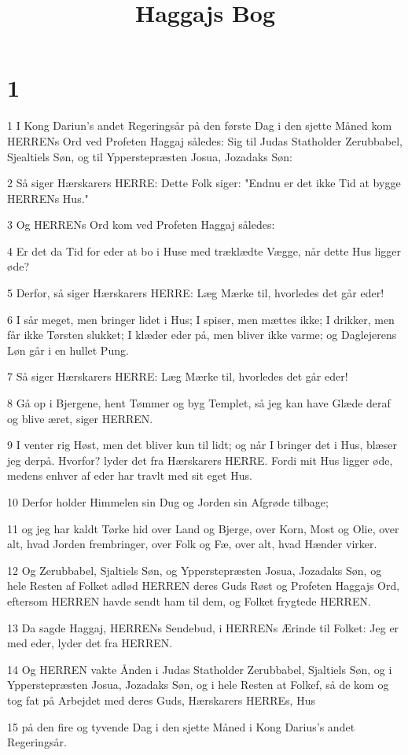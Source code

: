

\title{Haggajs Bog}


\chapter{1}

\par 1 I Kong Dariun's andet Regeringsår på den første Dag i den sjette Måned kom HERRENs Ord ved Profeten Haggaj således: Sig til Judas Statholder Zerubbabel, Sjealtiels Søn, og til Ypperstepræsten Josua, Jozadaks Søn:
\par 2 Så siger Hærskarers HERRE: Dette Folk siger: "Endnu er det ikke Tid at bygge HERRENs Hus."
\par 3 Og HERRENs Ord kom ved Profeten Haggaj således:
\par 4 Er det da Tid for eder at bo i Huse med træklædte Vægge, når dette Hus ligger øde?
\par 5 Derfor, så siger Hærskarers HERRE: Læg Mærke til, hvorledes det går eder!
\par 6 I sår meget, men bringer lidet i Hus; I spiser, men mættes ikke; I drikker, men får ikke Tørsten slukket; I klæder eder på, men bliver ikke varme; og Daglejerens Løn går i en hullet Pung.
\par 7 Så siger Hærskarers HERRE: Læg Mærke til, hvorledes det går eder!
\par 8 Gå op i Bjergene, hent Tømmer og byg Templet, så jeg kan have Glæde deraf og blive æret, siger HERREN.
\par 9 I venter rig Høst, men det bliver kun til lidt; og når I bringer det i Hus, blæser jeg derpå. Hvorfor? lyder det fra Hærskarers HERRE. Fordi mit Hus ligger øde, medens enhver af eder har travlt med sit eget Hus.
\par 10 Derfor holder Himmelen sin Dug og Jorden sin Afgrøde tilbage;
\par 11 og jeg har kaldt Tørke hid over Land og Bjerge, over Korn, Most og Olie, over alt, hvad Jorden frembringer, over Folk og Fæ, over alt, hvad Hænder virker.
\par 12 Og Zerubbabel, Sjaltiels Søn, og Ypperstepræsten Josua, Jozadaks Søn, og hele Resten af Folket adlød HERREN deres Guds Røst og Profeten Haggajs Ord, eftersom HERREN havde sendt ham til dem, og Folket frygtede HERREN.
\par 13 Da sagde Haggaj, HERRENs Sendebud, i HERRENs Ærinde til Folket: Jeg er med eder, lyder det fra HERREN.
\par 14 Og HERREN vakte Ånden i Judas Statholder Zerubbabel, Sjaltiels Søn, og i Ypperstepræsten Josua, Jozadaks Søn, og i hele Resten at Folkef, så de kom og tog fat på Arbejdet med deres Guds, Hærskarers HERREs, Hus
\par 15 på den fire og tyvende Dag i den sjette Måned i Kong Darius's andet Regeringsår.

